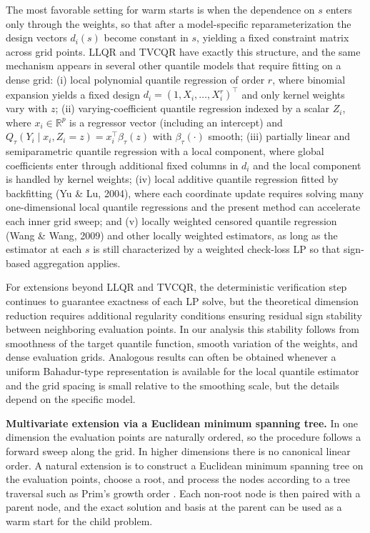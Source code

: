 \documentclass[lineno]{biometrika}
\begin{document}
The most favorable setting for warm starts is when the dependence on $s$ enters only through the weights, so that after
a model-specific reparameterization the design vectors $d_i(s)$ become constant in $s$, yielding a fixed constraint
matrix across grid points. LLQR and TVCQR have exactly this structure, and the same mechanism appears in several other
quantile models that require fitting on a dense grid: (i) local polynomial quantile regression of order $r$, where
binomial expansion yields a fixed design $d_i=(1,X_i,\ldots,X_i^r)^\top$ and only kernel weights vary with $z$;
(ii) varying-coefficient quantile regression indexed by a scalar $Z_i$, where $x_i\in\mathbb R^p$ is a regressor
vector (including an intercept) and $Q_\tau(Y_i\mid x_i,Z_i=z)=x_i^\top\beta_\tau(z)$ with $\beta_\tau(\cdot)$ smooth;
(iii) partially linear and semiparametric quantile regression with a local component, where global coefficients enter
through additional fixed columns in $d_i$ and the local component is handled by kernel weights; (iv) local additive
quantile regression fitted by backfitting (Yu \& Lu, 2004), where each coordinate update requires solving many
one-dimensional local quantile regressions and the present method can accelerate each inner grid sweep; and
(v) locally weighted censored quantile regression (Wang \& Wang, 2009) and other locally weighted estimators, as long
as the estimator at each $s$ is still characterized by a weighted check-loss LP so that sign-based aggregation applies.

For extensions beyond LLQR and TVCQR, the deterministic verification step continues to guarantee exactness of each LP
solve, but the theoretical dimension reduction requires additional regularity conditions ensuring residual sign
stability between neighboring evaluation points. In our analysis this stability follows from smoothness of the target
quantile function, smooth variation of the weights, and dense evaluation grids. Analogous results can often be
obtained whenever a uniform Bahadur-type representation is available for the local quantile estimator and the grid
spacing is small relative to the smoothing scale, but the details depend on the specific model.

\medskip\noindent\textbf{Multivariate extension via a Euclidean minimum spanning tree.}
In one dimension the evaluation points are naturally ordered, so the procedure follows a forward sweep along the grid.
In higher dimensions there is no canonical linear order. A natural extension is to construct a Euclidean minimum
spanning tree on the evaluation points, choose a root, and process the nodes according to a tree traversal such as
Prim's growth order \cite{Prim1957}. Each non-root node is then paired with a parent node, and the exact solution and
basis at the parent can be used as a warm start for the child problem.
\end{document}
